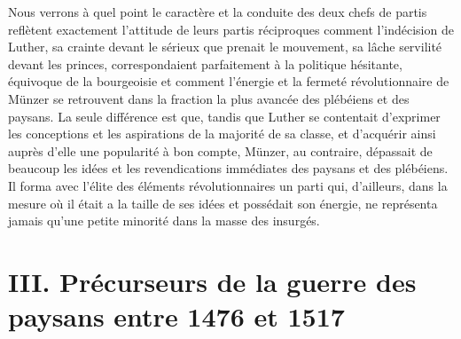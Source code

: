 \documentclass[french,twoside]{book} %
\newcommand\chapteropen{} %
\newcommand\chapterclose{} %
\begin{document}
Nous verrons à quel point le caractère et la conduite des deux chefs de partis reflètent exactement l’attitude de leurs partis réciproques comment l’indécision de Luther, sa crainte devant le sérieux que prenait le mouvement, sa lâche servilité devant les princes, correspondaient parfaitement à la politique hésitante, équivoque de la bourgeoisie et comment l’énergie et la fermeté révolutionnaire de Münzer se retrouvent dans la fraction la plus avancée des plébéiens et des paysans. La seule différence est que, tandis que Luther se contentait d’exprimer les conceptions et les aspirations de la majorité de sa classe, et d’acquérir ainsi auprès d’elle une popularité à bon compte, Münzer, au contraire, dépassait de beaucoup les idées et les revendications immédiates des paysans et des plébéiens. Il forma avec l’élite des éléments révolutionnaires un parti qui, d’ailleurs, dans la mesure où il était a la taille de ses idées et possédait son énergie, ne représenta jamais qu’une petite minorité dans la masse des insurgés.
\chapterclose


\chapteropen
\chapter[{III. Précurseurs de la guerre des paysans entre 1476 et 1517}]{III. Précurseurs de la guerre des paysans entre 1476 et 1517}\renewcommand{\leftmark}{III. Précurseurs de la guerre des paysans entre 1476 et 1517}
\end{document}
